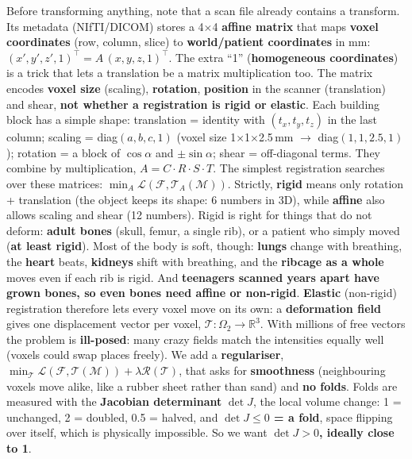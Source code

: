 \documentclass[a4paper]{article}
\newcommand{\K}[1]{\textcolor{kg}{\textbf{#1}}}
\newcommand{\F}[1]{\textcolor{fb}{#1}}
\newcommand{\E}[1]{\textcolor{ep}{#1}}
\newcommand{\T}[1]{\textcolor{tr}{\textbf{#1}}}
\newcommand{\ra}{\ensuremath{\to}}
\newcommand{\Om}{\Omega}
\begin{document}
Before transforming anything, note that a scan file already contains a transform. Its metadata (NIfTI/DICOM) stores a 4$\times$4 \K{affine matrix} that maps \K{voxel coordinates} (row, column, slice) to \K{world/patient coordinates} in mm: \F{$(x',y',z',1)^\top=A\,(x,y,z,1)^\top$}. The extra ``1'' (\K{homogeneous coordinates}) is a trick that lets a translation be a matrix multiplication too. The matrix encodes \K{voxel size} (scaling), \K{rotation}, \K{position} in the scanner (translation) and shear, \T{not whether a registration is rigid or elastic}. Each building block has a simple shape: translation = identity with $(t_x,t_y,t_z)$ in the last column; scaling = diag$(a,b,c,1)$ (\E{voxel size 1$\times$1$\times$2.5\,mm \ra{} diag$(1,1,2.5,1)$}); rotation = a block of $\cos\alpha$ and $\pm\sin\alpha$; shear = off-diagonal terms. They combine by multiplication, \F{$A=C\cdot R\cdot S\cdot T$}.
The simplest registration searches over these matrices: \F{$\min_A\mathcal L(\mathcal F,\mathcal T_A(\mathcal M))$}. Strictly, \K{rigid} means only rotation + translation (the object keeps its shape: 6 numbers in 3D), while \K{affine} also allows scaling and shear (12 numbers). Rigid is right for things that do not deform: \K{adult bones} (skull, femur, a single rib), or a patient who simply moved (\T{at least rigid}). Most of the body is soft, though: \K{lungs} change with breathing, the \K{heart} beats, \K{kidneys} shift with breathing, and the \K{ribcage as a whole} moves even if each rib is rigid. And \T{teenagers scanned years apart have grown bones, so even bones need affine or non-rigid}. \K{Elastic} (non-rigid) registration therefore lets every voxel move on its own: a \K{deformation field} gives one displacement vector per voxel, $\mathcal T:\Om_2\to\mathbb R^3$. With millions of free vectors the problem is \K{ill-posed}: many crazy fields match the intensities equally well (\E{voxels could swap places freely}). We add a \K{regulariser}, \F{$\min_{\mathcal T}\mathcal L(\mathcal F,\mathcal T(\mathcal M))+\lambda\mathcal R(\mathcal T)$}, that asks for \K{smoothness} (neighbouring voxels move alike, like a rubber sheet rather than sand) and \K{no folds}. Folds are measured with the \K{Jacobian determinant} $\det J$, the local volume change: 1 = unchanged, 2 = doubled, 0.5 = halved, and \T{$\det J\le0$ = a fold}, space flipping over itself, which is physically impossible. So we want \T{$\det J>0$, ideally close to 1}.
\end{document}
